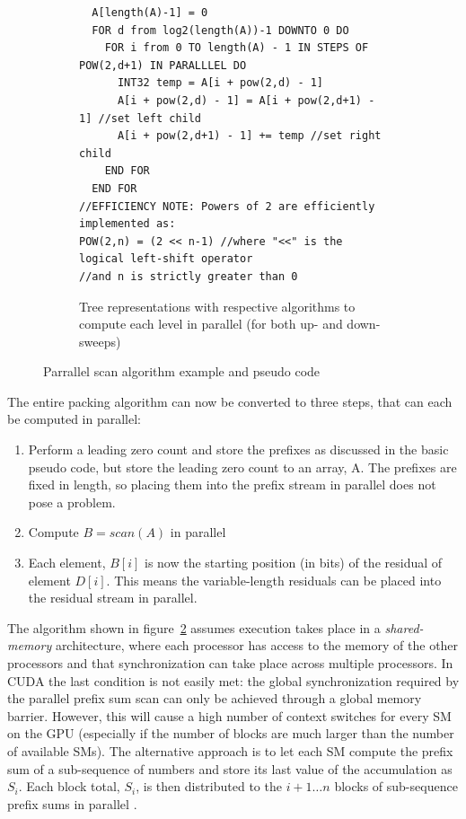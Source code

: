 \begin{figure}[h!]
\begin{mdframed}
\begin{subfigure}[b]{\textwidth}
	\begin{minipage}{\textwidth}
	\begin{lstlisting}
  A[length(A)-1] = 0
  FOR d from log2(length(A))-1 DOWNTO 0 DO
    FOR i from 0 TO length(A) - 1 IN STEPS OF POW(2,d+1) IN PARALLLEL DO
      INT32 temp = A[i + pow(2,d) - 1]
      A[i + pow(2,d) - 1] = A[i + pow(2,d+1) - 1] //set left child
      A[i + pow(2,d+1) - 1] += temp //set right child
    END FOR
  END FOR
//EFFICIENCY NOTE: Powers of 2 are efficiently implemented as:
POW(2,n) = (2 << n-1) //where "<<" is the logical left-shift operator
//and n is strictly greater than 0
      \end{lstlisting}
      \end{minipage}
      
      \caption{Tree representations with respective algorithms to compute each level in parallel (for both up- and down-sweeps)}
      \label{PARALLEL_SCAN_SUB_ALGORITHMS}
    \end{subfigure}
    \caption{Parrallel scan algorithm example and pseudo code \cite{blelloch1990prefix}}
    \label{PARALLEL_SCAN}
  \end{mdframed}
  \end{figure}
 
 The entire packing algorithm can now be converted to three steps, that can each be computed in parallel:
 \begin{enumerate}
  \item Perform a leading zero count and store the prefixes as discussed in the basic pseudo code, but store the leading zero count to an array, A. The prefixes are fixed in length, so placing them
  into the prefix stream in parallel does not pose a problem.
  \item Compute $B = scan(A)$ in parallel
  \item Each element, $B[i]$ is now the starting position (in bits) of the residual of element $D[i]$. This means the variable-length residuals can be placed into the residual stream in parallel.
 \end{enumerate}
 
 The algorithm shown in figure~\ref{PARALLEL_SCAN} assumes execution takes place in a \textit{shared-memory} architecture, where each processor has access to the memory of the other processors and that synchronization
 can take place across multiple processors. In CUDA the last condition is not easily met: the global synchronization required by the parallel prefix sum scan can only be achieved through a global memory barrier. 
 However, this will cause a high number of context switches for every SM on the GPU (especially if the number of blocks are much larger than the number of available SMs). The alternative approach is to let each SM
 compute the prefix sum of a sub-sequence of numbers and store its last value of the accumulation as $S_{i}$. Each block total, $S_{i}$, is then distributed to the $i+1\dots n$ blocks of sub-sequence prefix sums in 
 parallel \cite{harris2007parallel}.
 
